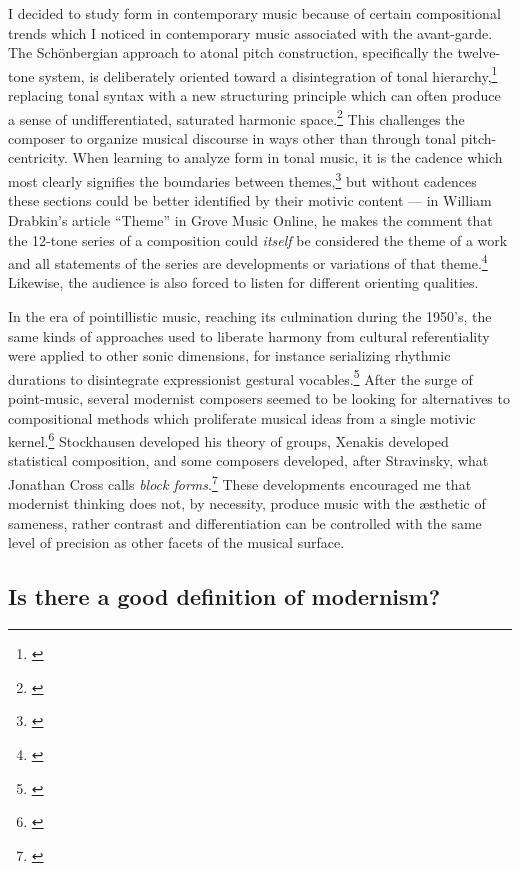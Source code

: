 I decided to study form in contemporary music because of certain compositional trends which I noticed in contemporary music associated with the avant-garde. The Schönbergian approach to atonal pitch construction, specifically the twelve-tone system, is deliberately oriented toward a disintegration of tonal hierarchy,\footnote{\citet[207]{schonberg}} replacing tonal syntax with a new structuring principle which can often produce a sense of undifferentiated, saturated harmonic space.\footnote{\citet[39]{stockhausen}} This challenges the composer to organize musical discourse in ways other than through tonal pitch-centricity. When learning to analyze form in tonal music, it is the cadence which most clearly signifies the boundaries between themes,\footnote{\citet[34]{white}} but without cadences these sections could be better identified by their motivic content — in William Drabkin's article ``Theme'' in Grove Music Online, he makes the comment that the 12-tone series of a composition could \textit{itself} be considered the theme of a work and all statements of the series are developments or variations of that theme.\footnote{\citet{grove}} Likewise, the audience is also forced to listen for different orienting qualities.

In the era of pointillistic music, reaching its culmination during the 1950's, the same kinds of approaches used to liberate harmony from cultural referentiality were applied to other sonic dimensions, for instance serializing rhythmic durations to disintegrate expressionist gestural vocables.\footnote{\citet[22]{ferneyhough}} After the surge of point-music, several modernist composers seemed to be looking for alternatives to compositional methods which proliferate musical ideas from a single motivic kernel.\footnote{\citet[81]{griffiths}} Stockhausen developed his theory of groups, Xenakis developed statistical composition, and some composers developed, after Stravinsky, what Jonathan Cross calls \textit{block forms}.\footnote{\citet[20]{cross}} These developments encouraged me that modernist thinking does not, by necessity, produce music with the æsthetic of sameness, rather contrast and differentiation can be controlled with the same level of precision as other facets of the musical surface.

\subsection{Is there a good definition of modernism?}


